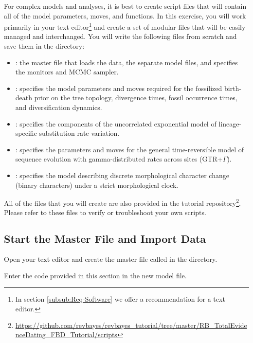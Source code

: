 For complex models and analyses, it is best to create \Rev script files that will contain all of the model parameters, moves, and functions. 
In this exercise, you will work primarily in your text editor\footnote{In section \ref{subsub:Req-Software} we offer a recommendation for a text editor.} and create a set of modular files that will be easily managed and interchanged.
You will write the following files from scratch and save them in the  directory:
\begin{itemize}[noitemsep,topsep=0pt]
\item {}: the master \Rev file that loads the data, the separate model files, and specifies the monitors and MCMC sampler.
\item {}: specifies the model parameters and moves required for the fossilized birth-death prior on the tree topology, divergence times, fossil occurrence times, and diversification dynamics.
\item {}: specifies the components of the uncorrelated exponential model of lineage-specific substitution rate variation.
\item {}: specifies the parameters and moves for the general time-reversible model of sequence evolution with gamma-distributed rates across sites (GTR+$\Gamma$).
\item {}: specifies the model describing discrete morphological character change (binary characters) under a strict morphological clock. 
\end{itemize}

All of the files that you will create are also provided in the \RevBayes tutorial repository\footnote{\url{https://github.com/revbayes/revbayes_tutorial/tree/master/RB_TotalEvidenceDating_FBD_Tutorial/scripts}}. 
Please refer to these files to verify or troubleshoot your own scripts. 


\bigskip
\subsection{Start the Master \Rev File and Import Data}\label{subsect:Exercise-StartMasterRev}



{\begin{framed}
Open your text editor and create the master \Rev file called {\textcolor{red}{}} in the  directory.

Enter the \Rev code provided in this section in the new model file.
\end{framed}}

